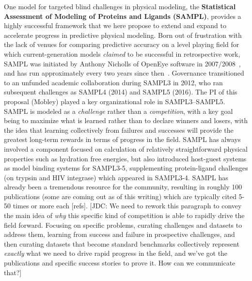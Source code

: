 \documentclass[11pt]{article}
\begin{document}
One model for targeted blind challenges in physical modeling, the {\bf Statistical Assessment of Modeling of Proteins and Ligands (SAMPL)}, provides a highly successful framework that we here propose to extend and expand to accelerate progress in predictive physical modeling.
Born out of frustration with the lack of venues for comparing predictive accuracy on a level playing field for which current-generation models \emph{claimed} to be successful in retrospective work, SAMPL was initiated by Anthony Nicholls of OpenEye software in 2007/2008~\cite{nicholls_predicting_2008}, and has run approximately every two years since then~\cite{nicholls_samp1_2009, mobley_predictions_2009, geballe_sampl2_2010, geballe_sampl3_2012, mobley_blind_2014-1, muddana_sampl4_2014, bannan_blind_2016, yin_sampl5_preprint}.
Governance transitioned to an unfunded academic collaboration during SAMPL3 in 2012, who ran subsequent challenges as SAMPL4 (2014) and SAMPL5 (2016).
The PI of this proposal (Mobley) played a key organizational role in SAMPL3--SAMPL5.
SAMPL is modeled as a \emph{challenge} rather than a \emph{competition}, with a key goal being to maximize what is learned rather than to declare winners and losers, with the idea that learning collectively from failures and successes will provide the greatest long-term rewards in terms of progress in the field.
SAMPL has always involved a component focused on calculation of relatively straightforward physical properties such as hydration free energies, but also introduced host-guest systems as model binding systems for SAMPL3-5, supplementing protein-ligand challenges (on trypsin and HIV integrase) which appeared in SAMPL3-4. 
SAMPL has already been a tremendous resource for the community, resulting in roughly 100 publications (some are coming out as of this writing) which are typically cited 5-50 times or more each [refs].
{\color{red}[JDC: We need to rework this paragraph to convey the main idea of \emph{why} this specific kind of competition is able to rapidly drive the field forward. Focusing on specific problems, curating challenges and datasets to address them, learning from success and failure in prospective challenges, and then curating datasets that become standard benchmarks collectively represent \emph{exactly} what we need to drive rapid progress in the field, and we've got the publications and specific success stories to prove it. How can we communicate that?]}
\end{document}
